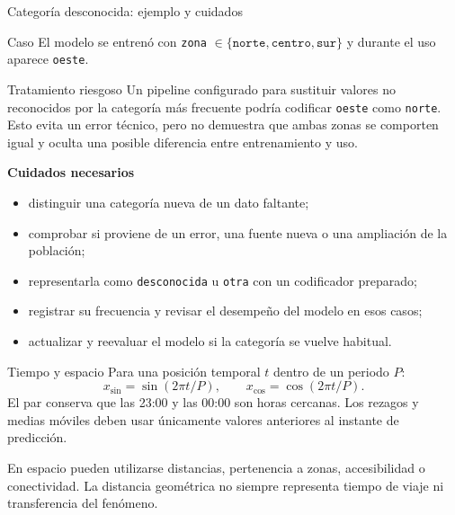 \documentclass[aspectratio=169,10pt]{beamer}
\begin{document}
\begin{frame}{Categoría desconocida: ejemplo y cuidados}
  \footnotesize
  \begin{block}{Caso}
    El modelo se entrenó con \texttt{zona} $\in \{\texttt{norte},\texttt{centro},\texttt{sur}\}$ y durante el uso aparece \texttt{oeste}.
  \end{block}
  \begin{alertblock}{Tratamiento riesgoso}
    Un pipeline configurado para sustituir valores no reconocidos por la categoría más frecuente podría codificar \texttt{oeste} como \texttt{norte}. Esto evita un error técnico, pero no demuestra que ambas zonas se comporten igual y oculta una posible diferencia entre entrenamiento y uso.
  \end{alertblock}
  \textbf{Cuidados necesarios}
  \begin{itemize}
    \item distinguir una categoría nueva de un dato faltante;
    \item comprobar si proviene de un error, una fuente nueva o una ampliación de la población;
    \item representarla como \texttt{desconocida} u \texttt{otra} con un codificador preparado;
    \item registrar su frecuencia y revisar el desempeño del modelo en esos casos;
    \item actualizar y reevaluar el modelo si la categoría se vuelve habitual.
  \end{itemize}
\end{frame}

\begin{frame}{Tiempo y espacio}
  \small
  Para una posición temporal $t$ dentro de un periodo $P$:
  \[
    x_{\sin}=\sin(2\pi t/P),\qquad x_{\cos}=\cos(2\pi t/P).
  \]
  El par conserva que las 23:00 y las 00:00 son horas cercanas. Los rezagos y medias móviles deben usar únicamente valores anteriores al instante de predicción.
  \vspace{.55em}

  En espacio pueden utilizarse distancias, pertenencia a zonas, accesibilidad o conectividad. La distancia geométrica no siempre representa tiempo de viaje ni transferencia del fenómeno.
\end{frame}
\end{document}
